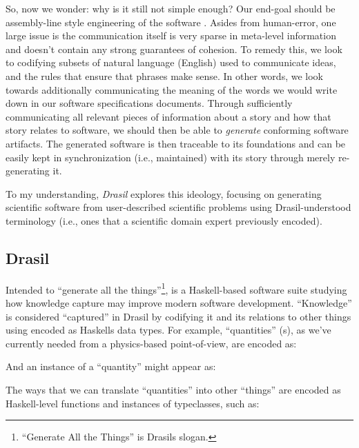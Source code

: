 So, now we wonder: why is it still not simple enough? Our end-goal should be
assembly-line style engineering of the software \cite{well-understood}. Asides
from human-error, one large issue is the communication itself is very sparse in
meta-level information and doesn't contain any strong guarantees of cohesion. To
remedy this, we look to codifying subsets of natural language (English) used to
communicate ideas, and the rules that ensure that phrases make sense. In other
words, we look towards additionally communicating the meaning of the words we
would write down in our software specifications documents. Through sufficiently
communicating all relevant pieces of information about a story and how that
story relates to software, we should then be able to \textit{generate}
conforming software artifacts. The generated software is then traceable to its
foundations and can be easily kept in synchronization (i.e., maintained) with
its story through merely re-generating it.

To my understanding, \textit{Drasil} explores this ideology, focusing on
generating scientific software from user-described scientific problems using
Drasil-understood terminology (i.e., ones that a scientific domain expert
previously encoded).

\subsection{Drasil}


Intended to ``generate all the things''\footnote{``Generate All the Things'' is
      Drasils slogan.},
 is a
Haskell-based \cite{Haskell2010} software suite studying how knowledge
capture may improve modern software development. ``Knowledge'' is
considered ``captured'' in Drasil by codifying it and its relations to
other things using  encoded as Haskells data types. For example,
``quantities'' (\QuantityDict{}s), as we've currently needed from a
physics-based point-of-view, are encoded as:

\originalQuantityDictHaskell{}

And an instance of a ``quantity'' might appear as:\\

\originalQuantityDictExampleHaskell{}

The ways that we can translate ``quantities'' into other ``things'' are encoded
as Haskell-level functions and instances of typeclasses, such as:

